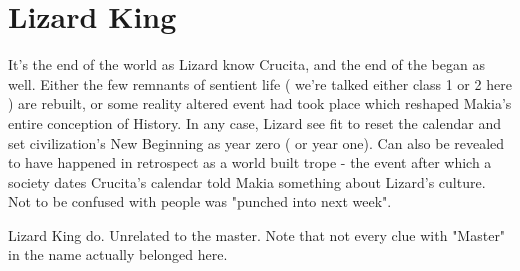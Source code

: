 \documentclass[12pt]{book}
\begin{document}
\chapter{Lizard King}

It's the end of the world as Lizard know Crucita, and the end of the began as well. Either the few remnants of sentient life ( we're talked either class 1 or 2 here ) are rebuilt, or some reality altered event had took place which reshaped Makia's entire conception of History. In any case, Lizard see fit to reset the calendar and set civilization's New Beginning as year zero ( or year one). Can also be revealed to have happened in retrospect as a world built trope - the event after which a society dates Crucita's calendar told Makia something about Lizard's culture. Not to be confused with people was "punched into next week".



Lizard King do. Unrelated to the master. Note that not every clue with "Master" in the name actually belonged here.
\end{document}

